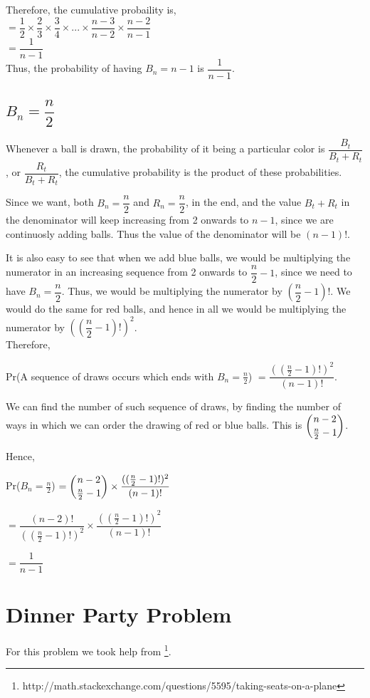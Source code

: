 \documentclass{article}
\begin{document}
Therefore, the cumulative probaility is, \\
$= \dfrac{1}{2} \times \dfrac{2}{3} \times \dfrac{3}{4} \times ... \times \dfrac{n-3}{n-2} \times \dfrac{n-2}{n-1}$ \\
$= \dfrac{1}{n-1}$ \\
Thus, the probability of having $B_{n} = n-1$ is $\dfrac{1}{n-1}$.
\subsection{$B_{n} = \dfrac{n}{2}$}
Whenever a ball is drawn, the probability of it being a 
particular color is $\dfrac{B_{t}}{B_{t} + R_{t}}$, or
$\dfrac{R_{t}}{B_{t}+R_{t}}$, the cumulative probability
is the product of these probabilities.

Since we want, both $B_{n} = \dfrac{n}{2}$ and 
$R_{n} = \dfrac{n}{2}$, in the end, and the value 
$B_{t}+R_{t}$ in the denominator will keep increasing
from 2 onwards to $n-1$, since we are continuosly adding
balls. Thus the value of the denominator will be $(n-1)!$.

It is also easy to see that when we add blue balls, we
would be multiplying the numerator in an increasing 
sequence from 2 onwards to $\dfrac{n}{2}-1$, since we
need to have $B_{n} = \dfrac{n}{2}$. Thus, we would
be multiplying the numerator by $\left(\dfrac{n}{2}-1\right)!$.
We would do the same for red balls, and hence in all
we would be multiplying the numerator by 
$\left(\left(\dfrac{n}{2}-1\right)!\right)^2$. \\

Therefore,

Pr(A sequence of draws occurs which ends with $B_{n} = \frac{n}{2}$) $ = \dfrac{((\frac{n}{2}-1)!)^2}{(n-1)!} $.

We can find the number of such sequence of draws, by finding the
number of ways in which we can order the drawing of red or blue
balls. This is $\dbinom{n-2}{\frac{n}{2}-1}$.

Hence,

Pr($B_n = \frac{n}{2}$) $ = \dbinom{n-2}{\frac{n}{2}-1} \times
\dfrac{((\frac{n}{2}-1)!)^2}{(n-1)!}$

$= \dfrac{(n-2)!}{((\frac{n}{2}-1)!)^2} \times \dfrac{((\frac{n}{2}-1)!)^2}{(n-1)!}$

$= \dfrac{1}{n-1}$

\clearpage

\section{Dinner Party Problem}
For this problem we took help from 
\footnote{http://math.stackexchange.com/questions/5595/taking-seats-on-a-plane}.
\end{document}
